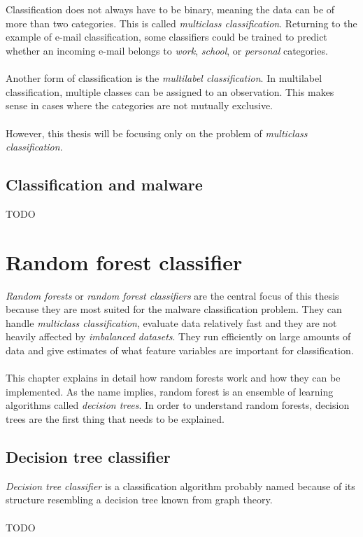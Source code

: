 \documentclass[11pt]{article}
\begin{document}
      \\~\\
      Classification does not always have to be binary, meaning the data can be of more than two categories. This is called {\it multiclass classification}. Returning to the example of e-mail classification, some classifiers could be trained to predict whether an incoming e-mail belongs to {\it work}, {\it school}, or {\it personal} categories.
      \\~\\
      Another form of classification is the {\it multilabel classification}. In multilabel classification, multiple classes can be assigned to an observation. This makes sense in cases where the categories are not mutually exclusive.
      \\~\\
      However, this thesis will be focusing only on the problem of {\it multiclass classification}.
      \newpage
    \subsection{Classification and malware}
      {\color{red}TODO}
  \newpage
  \section{Random forest classifier}
    {\it Random forests} or {\it random forest classifiers} are the central focus of this thesis because they are most suited for the malware classification problem. They can handle {\it multiclass classification}, evaluate data relatively fast and they are not heavily affected by {\it imbalanced datasets}. \citep{brabec} They run efficiently on large amounts of data and give estimates of what feature variables are important for classification. \citep{breiman}
    \\~\\
    This chapter explains in detail how random forests work and how they can be implemented. As the name implies, random forest is an ensemble of learning algorithms called {\it decision trees}. In order to understand random forests, decision trees are the first thing that needs to be explained.
    \subsection{Decision tree classifier}
      {\it Decision tree classifier} is a classification algorithm probably named because of its structure resembling a decision tree known from graph theory.
      \\~\\
      {\color{red}TODO}
\end{document}
